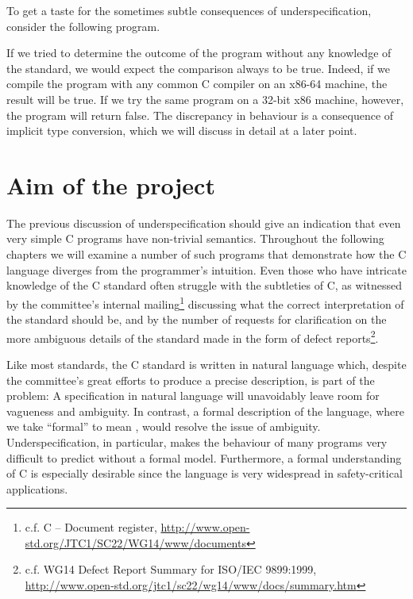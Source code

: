 \documentclass[a4paper,12pt]{scrbook}
\theoremstyle{plain}
\theoremstyle{definition}
\begin{document}
To get a taste for the sometimes subtle consequences of underspecification,
consider the following program.

If we tried to determine the outcome of the program without any knowledge of
the standard, we would expect the comparison always to be true. Indeed, if we
compile the program with any common C compiler on an x86-64 machine, the result
will be true. If we try the same program on a 32-bit x86 machine, however, the
program will return false. The discrepancy in behaviour is a consequence of
implicit type conversion, which we will discuss in detail at a later point.

\section{Aim of the project}
The previous discussion of underspecification should give an indication that
even very simple C programs have non-trivial semantics. Throughout the following
chapters we will examine a number of such programs that demonstrate how the C
language diverges from the programmer's intuition. Even those who have intricate
knowledge of the C standard often struggle with the subtleties of C, as
witnessed by the committee's internal mailing\footnote{ c.f. C -- Document
  register, \url{http://www.open-std.org/JTC1/SC22/WG14/www/documents} }
discussing what the correct interpretation of the standard should be, and by the
number of requests for clarification on the more ambiguous details of the
standard made in the form of defect reports\footnote{ c.f. WG14 Defect Report
  Summary for ISO/IEC 9899:1999,
  \url{http://www.open-std.org/jtc1/sc22/wg14/www/docs/summary.htm} }.

Like most standards, the C standard is written in natural language which,
despite the committee's great efforts to produce a precise description, is part
of the problem: A specification in natural language will unavoidably leave room
for vagueness and ambiguity. In contrast, a formal description of the language,
where we take ``formal'' to mean 
\cite[p. 2]{norrishPhd}, would resolve the issue of
ambiguity. Underspecification, in particular, makes the behaviour of many
programs very difficult to predict without a formal model. Furthermore, a formal
understanding of C is especially desirable since the language is very widespread
in safety-critical applications.
\end{document}

